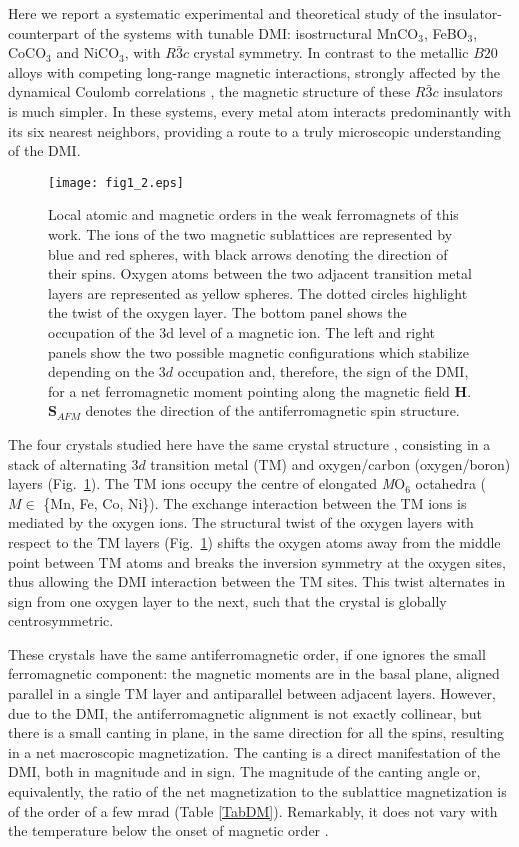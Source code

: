 \documentclass[aps,prl,showpacs,reprint,floatfix]{revtex4-1}
\begin{document}
Here we report a systematic experimental and theoretical study of the insulator-counterpart of the systems with tunable DMI: 
isostructural MnCO$_{3}$, FeBO$_3$, CoCO$_3$ and NiCO$_3$, with $R\bar{3}c$ crystal symmetry.
In contrast to the metallic $B20$ alloys with competing long-range magnetic interactions, strongly affected by the dynamical Coulomb correlations \cite{Mazurenko},
the magnetic structure of these $R\bar{3}c$ insulators is much simpler.
In these systems, every metal atom interacts predominantly with its six nearest neighbors, 
providing a route to a truly microscopic understanding of the DMI.

\begin{figure}[!ht]
 \texttt{[image: fig1\_2.eps]}
 \caption{Local atomic and magnetic orders in the weak ferromagnets of this work. 
 The ions of the two magnetic sublattices are represented by blue and red spheres, with black arrows denoting the direction of their spins.
 Oxygen atoms between the two adjacent transition metal layers are represented as yellow spheres. The dotted circles highlight the twist of the oxygen layer. The bottom panel shows the occupation of the 3d level of a magnetic ion. The left and right panels show the two possible magnetic configurations which stabilize depending on the $3d$ occupation and, therefore, the sign of the DMI, for a net ferromagnetic moment pointing along the magnetic field $\mathbf{H}$. 
 $\mathbf{S}_{AFM}$ denotes the direction of the antiferromagnetic spin structure.}
 \label{FIG1}
\end{figure}

The four crystals studied here have the same crystal structure \cite{Wyckoff,Diehl,Maslen,Pertlik}, 
consisting in a stack of alternating $3d$ transition metal (TM) and oxygen/carbon (oxygen/boron) layers (Fig.~\ref{FIG1}). 
The TM ions occupy the centre of elongated \textit{M}O$_6$ octahedra ($M\in$ \{Mn, Fe, Co, Ni\}). 
The exchange interaction between the TM ions is mediated by the oxygen ions.
The structural twist of the oxygen layers with respect to the TM layers (Fig.~\ref{FIG1})
shifts the oxygen atoms away from the middle point between TM atoms and 
breaks the inversion symmetry at the oxygen sites, thus allowing the DMI interaction between the TM sites.
This twist alternates in sign from one oxygen layer to the next, such that the crystal is globally centrosymmetric.

These crystals have the same antiferromagnetic order, if one ignores the small ferromagnetic component: 
the magnetic moments are in the basal plane, aligned parallel in a single TM layer and antiparallel between adjacent layers.
However, due to the DMI, the antiferromagnetic alignment is not exactly collinear, but there is a small canting in plane, in the same direction for all the spins, 
resulting in a net macroscopic magnetization.
The canting is a direct manifestation of the DMI, both in magnitude and in sign.
The magnitude of the canting angle or, equivalently, the ratio of the net magnetization to the sublattice 
magnetization is of the order of a few mrad \cite{Borovik1959,Borovik1961,Kreines,Petrov,Kobler} (Table \ref{TabDM}). 
Remarkably, it does not vary with the temperature below the onset of magnetic order \cite{Petrov}.
\end{document}
